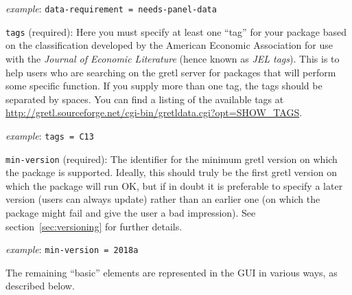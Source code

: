 \documentclass[oneside]{book}
\newcommand{\ttusage}[1]{\textit{example}: \quad \texttt{#1}}
\begin{document}
\begin{description}
  \ttusage{data-requirement = needs-panel-data}

\item \texttt{tags} (required): Here you must specify at least one
  ``tag'' for your package based on the classification developed by
  the American Economic Association for use with the \textit{Journal
    of Economic Literature} (hence known as \textit{JEL tags}). This
  is to help users who are searching on the gretl server for packages
  that will perform some specific function. If you supply more than
  one tag, the tags should be separated by spaces. You can find a
  listing of the available tags at
  \url{http://gretl.sourceforge.net/cgi-bin/gretldata.cgi?opt=SHOW_TAGS}.

  \ttusage{tags = C13}

\item \texttt{min-version} (required): The identifier for the minimum
  gretl version on which the package is supported.  Ideally, this
  should truly be the first gretl version on which the package will
  run OK, but if in doubt it is preferable to specify a later version
  (users can always update) rather than an earlier one (on which the
  package might fail and give the user a bad impression). See
  section~\ref{sec:versioning} for further details.

   \ttusage{min-version = 2018a}

\end{description}

The remaining ``basic'' elements are represented in the GUI
in various ways, as described below.
\end{document}
